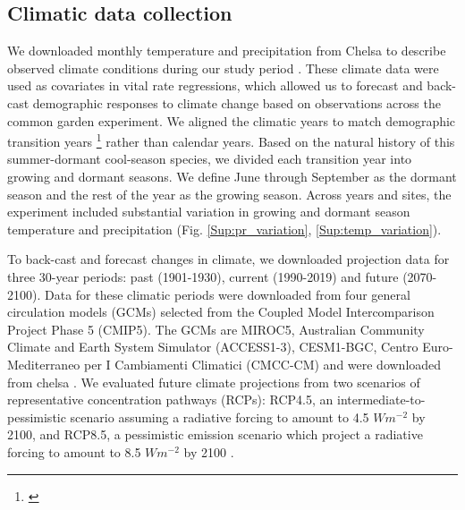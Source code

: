 \documentclass[12pt]{article}
\newcommand{\tom}[2]{{\color{red}{#1}}\footnote{\textit{\color{red}{#2}}}}
\begin{document}
\subsection*{Climatic data collection}
We downloaded monthly temperature and precipitation from Chelsa to describe observed climate conditions during our study period \citep{karger2017climatologies}.
These climate data were used as covariates in vital rate regressions, which allowed us to forecast and back-cast demographic responses to climate change based on observations across the common garden experiment. 
We aligned the climatic years to match demographic transition years \tom{(May 1 -- April 30)}{I am not sure if these are actually the right dates.} rather than calendar years.
Based on the natural history of this summer-dormant cool-season species, we divided each transition year into growing and dormant seasons. 
We define June through September as the dormant season and the rest of the year as the growing season. 
Across years and sites, the experiment included substantial variation in growing and dormant season temperature and precipitation (Fig. \ref{Sup:pr_variation}, \ref{Sup:temp_variation}).

To back-cast and forecast changes in climate, we downloaded projection data for three 30-year periods: past (1901-1930), current (1990-2019) and future (2070-2100).
Data for these climatic periods were downloaded from four general circulation models (GCMs) selected from the Coupled Model Intercomparison Project Phase 5 (CMIP5). 
The GCMs are MIROC5, Australian Community Climate and Earth System Simulator (ACCESS1-3), CESM1-BGC, Centro Euro-Mediterraneo per I Cambiamenti Climatici (CMCC-CM)  and were downloaded from chelsa \citep{sanderson2015representative}.
We evaluated future climate projections from two scenarios of representative concentration pathways (RCPs): RCP4.5, an intermediate-to-pessimistic scenario assuming a radiative forcing to amount to 4.5 $W m^{-2}$ by 2100, and RCP8.5, a pessimistic emission scenario which project a radiative forcing to amount to 8.5 $W m^{-2}$ by 2100 \citep{thomson2011rcp4, schwalm2020rcp8}.
\end{document}
